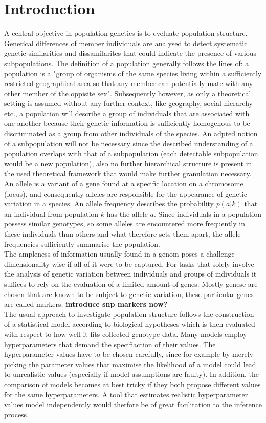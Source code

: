 \documentclass[a4paper, 11pt]{article}
\begin{document}
\section{Introduction}
A central objective in population genetics is to eveluate population structure. Genetical differences of member individuals are analysed  to detect systematic genetic similarities and dissamilarites that could indicate the presence of various subpopulations. The definition of a population generally follows the lines of: a population is a "group of organisms of the same species living within a sufficiently restricted geographical area so that any member can potentially mate with any other member of the oppisite sex". Subsequently however, as only a theoretical setting is assumed without any further context, like geography, social hierarchy etc., a population will describe a group of individuals that are associated with one another because their genetic information is  sufficiently homogenous to be discriminated as a group from other individuals of the species. An adpted notion of a subpopulation will not be necessary since the described understanding of a population overlaps with that of a subpopulation (each detectable subpopulation would be a new population), also no further hierarchical structure is present in the used theoretical framework that would make further granulation necessary.\\
An allele is a variant of a gene found at a specific location on a chromosome (locus), and consequently alleles are responsible for the appearance of genetic variation in a species. An allele frequency describes the probability $p(a | k)$ that an individual from population $k$ has the allele $a$. Since individuals in a population possess similar genotypes, so some alleles are encountered more frequently in these individuals than others and what therefore sets them apart, the allele frequencies sufficiently summarise the population.\\
The ampleness of information usually found in a genom poses a challenge dimensionality wise if all of it were to be captured. For tasks that solely involve the analysis of genetic variation between individuals and groups of individuals it suffices to rely on the evaluation of a limited amount of genes. Mostly genese are chosen that are known to be subject to genetic variation, these particular genes are called markers. \textbf{introduce snp markers now?} \\
The usual approach to investigate population structure follows the construction of a statistical model according to biological hypotheses which is then evaluated with respect to how well it fits collected genotype data. Many models employ hyperparameters that demand the specifiaction of their values. The hyperparameter values have to be chosen carefully, since for example by merely picking the parameter values that maximise the likelihood of a model could lead to unrealistic values (especially if model assumptions are faulty). In addition, the comparison of models becomes at best tricky if they both propose different values for the same hyperparameters. A tool that estimates realistic hyperparameter values model independently would therfore be of great facilitation to the inference process.\\
\end{document}
